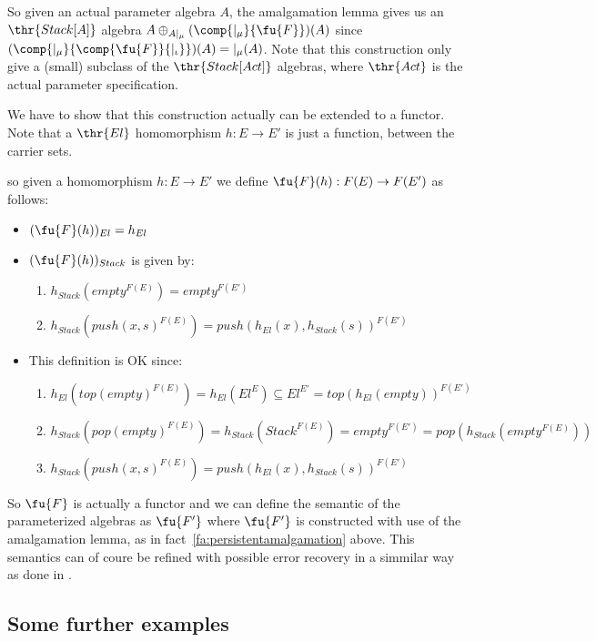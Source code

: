 So given an actual parameter algebra $A$, the amalgamation lemma gives us an $\thr{Stack[A]}$ algebra $A \oplus_{A|_{\mu}} (\comp{|_{\mu}}{\fu{F}})(A)$ since $(\comp{|_{\mu}}{\comp{\fu{F}}{|_{\iota}}})(A)= {|_{\mu}}(A)$. Note that this construction only give a (small) subclass of the $\thr{Stack[Act]}$ algebras, where $\thr{Act}$ is the actual parameter specification.

We have to show that this construction actually can be extended to a functor. Note that a $\thr{El}$ homomorphism $h:E \to E'$ is just a function, between the carrier sets.

so given a homomorphism $h:E \to E'$ we define $\fu{F}(h):F(E) \to F(E')$ as follows:
	\begin{itemize}
	\item $(\fu{F}(h))_{El}= h_{El}$		
	\item $(\fu{F}(h))_{Stack}$ is given by:
		\begin{enumerate}
		\item $h_{Stack}(empty^{F(E)})= empty^{F(E')}$
		\item $h_{Stack}(push(x,s)^{F(E)}) = push(h_{El}(x),h_{Stack}(s))^{F(E')}$
		\end{enumerate} 
	\item This definition is OK since:
		\begin{enumerate} 
		\item $h_{El}(top(empty)^{F(E)})= h_{El}(El^E) \subseteq El^{E'}= top(h_{El}(empty))^{F(E')}$
		\item $h_{Stack}(pop(empty)^{F(E)})= h_{Stack}(Stack^{F(E)}) = empty^{F(E')}= pop(h_{Stack}(empty^{F(E)}))$
		
		\item $h_{Stack}(push(x,s)^{F(E)}) = push(h_{El}(x),h_{Stack}(s))^{F(E')}$
		\end{enumerate}
	\end{itemize}
So $\fu{F}$ is actually a functor and we can define the semantic of the parameterized algebras as $\fu{F'}$ where $\fu{F'}$ is constructed with use of the amalgamation lemma, as in fact~\ref{fa:persistentamalgamation} above.
This semantics can of coure be refined with possible error recovery in a simmilar way as done in \cite{partial}.


\subsection{Some further examples}

